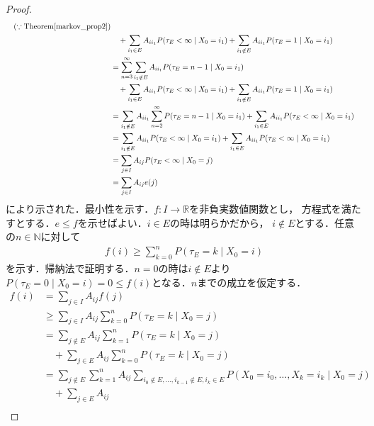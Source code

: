 \documentclass[dvipdfmx,autodetect-engine]{jsarticle}
\theoremstyle{remark}
\theoremstyle{definition}
\newcommand{\R}{\mathbb{R}}
\newcommand{\N}{\mathbb{N}}
\begin{document}
\begin{proof}
\begin{align}
        \quad (\because \mathrm{Theorem}\ref{markov_prop2})\\
        &\quad + \sum_{i_{1} \in E} A_{i i_{1}} P(\tau_{E} <\infty \mid X_0 = i_{1})
        + \sum_{i_{1} \notin E} A_{i i_{1}} P(\tau_{E} = 1 \mid X_0 = i_{1})\\
        &= \sum_{n=3}^{\infty} \sum_{i_{1} \notin E} A_{i i_{1}} 
        P(\tau_{E} = n-1 \mid X_0 = i_1) \\
        &\quad + \sum_{i_{1} \in E} A_{i i_{1}} P(\tau_{E} <\infty \mid X_0 = i_{1})
        + \sum_{i_{1} \notin E} A_{i i_{1}} P(\tau_{E} = 1 \mid X_0 = i_{1})\\
        &= \sum_{i_{1} \notin E} A_{i i_{1}} \sum_{n=2}^{\infty} 
        P(\tau_{E} = n-1 \mid X_0 = i_1) 
        + \sum_{i_{1} \in E} A_{i i_{1}} P(\tau_{E} <\infty \mid X_0 = i_{1})\\
        &= \sum_{i_{1} \notin E} A_{i i_{1}} P(\tau_{E} < \infty \mid X_0 = i_{1})
        + \sum_{i_{1} \in E} A_{i i_{1}} P(\tau_{E} <\infty \mid X_0 = i_{1})\\
        &= \sum_{j \in I} A_{i j} P(\tau_{E} < \infty \mid X_0 = j)\\
        &= \sum_{j \in I} A_{ij} e(j)
    \end{align}
    により示された．最小性を示す．$f \colon I \to \R$を非負実数値関数とし，
    方程式を満たすとする．$e \leq f$を示せばよい．$i \in E$の時は明らかだから，
    $i \notin E$とする．任意の$n \in \N$に対して
    \begin{align}
        f(i) \geq \sum_{k=0}^{n} P(\tau_{E} = k \mid X_0 = i)
    \end{align}
    を示す．帰納法で証明する．$n=0$の時は$i \notin E$より
    $P(\tau_{E} =0\mid X_0 = i) = 0\leq f(i)$となる．$n$までの成立を仮定する．
    \begin{align}
        f(i) &= \sum_{j\in I} A_{ij}f(j) \\
            &\geq \sum_{j \in I} A_{ij} \sum_{k=0}^{n} P(\tau_{E} = k \mid X_0 = j) \\
            &= \sum_{j \notin E} A_{ij} \sum_{k=1}^{n} P(\tau_{E} = k \mid X_0 = j)\\
            &\quad + \sum_{j \in E} A_{ij} \sum_{k=0}^{n} P(\tau_{E} = k \mid X_0 = j) \\
            &= \sum_{j \notin E} \sum_{k=1}^{n} A_{ij}
            \sum_{i_0 \notin E,\ldots,i_{k-1} \notin E,i_{k} \in E}
             P(X_0 = i_0,\ldots,X_k = i_k \mid X_0 = j)\\
            &\quad + \sum_{j \in E} A_{ij}  \\

\end{align}
\end{proof}
\end{document}
